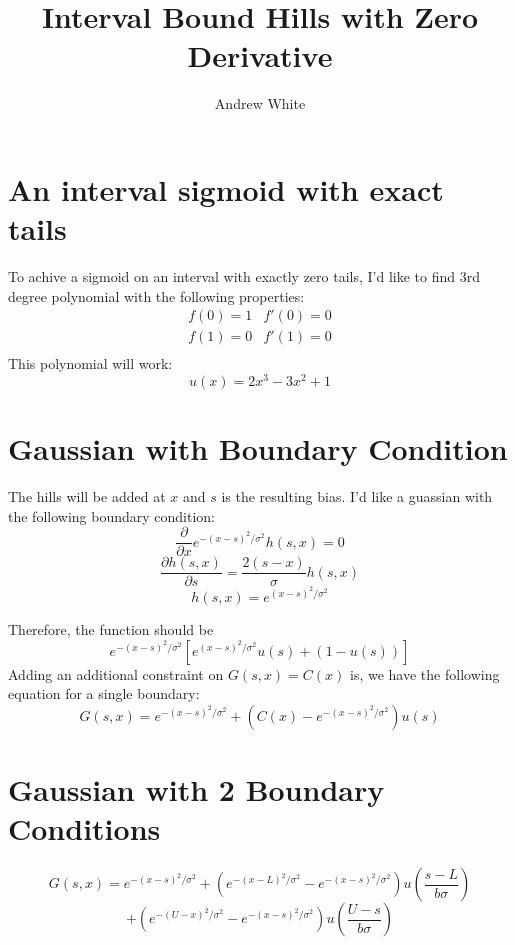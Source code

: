 \documentclass{article}
\author{Andrew White}
\title{Interval Bound Hills with Zero Derivative}
\begin{document}
\maketitle

\section{An interval sigmoid with exact tails}
To achive a sigmoid on an interval with exactly zero tails, I'd like
to find 3rd degree polynomial with the following properties: 
\[
\begin{array}{lr}
f(0) = 1 & f'(0) = 0\\
f(1) = 0 & f'(1) = 0\\
\end{array}
\]
This polynomial will work:
\begin{equation}
u(x) = 2 x^3 - 3x^2 + 1
\end{equation}


\section{Gaussian with Boundary Condition} 
The hills will be added at $x$ and $s$ is the resulting bias. I'd like
a guassian with the following boundary condition:
\[
\frac{\partial}{\partial x} e^{-(x - s)^2 / \sigma^2} h(s,x) = 0
\]
\[
\frac{\partial h(s,x)}{\partial s} = \frac{2(s - x)}{\sigma} h(s,x)
\]
\[
h(s,x) = e^{(x - s)^2 / \sigma^2}
\]

Therefore, the function should be
\[
e^{-(x - s)^2 / \sigma^2} \left[e^{(x - s)^2/\sigma^2}u(s) + (1 - u(s)) \right]
\]
Adding an additional constraint on $G(s,x) = C(x)$ is, we have the
following equation for a single boundary:
\begin{equation}
G(s,x) = e^{-(x - s)^2 / \sigma^2} + \left(C(x) - e^{-(x - s)^2 / \sigma^2}\right)u(s)
\end{equation}

\section{Gaussian with 2 Boundary Conditions} 
\[
G(s,x) = e^{-(x - s)^2 / \sigma^2} + \left(e^{-(x-L)^2/\sigma^2} - e^{-(x - s)^2 / \sigma^2}\right)u\left(\frac{s-L}{b\sigma}\right)
\]
\begin{equation}
+ \left(e^{-(U-x)^2/\sigma^2} - e^{-(x - s)^2 / \sigma^2}\right)u\left(\frac{U-s}{b\sigma}\right)
\end{equation}
\end{document}
